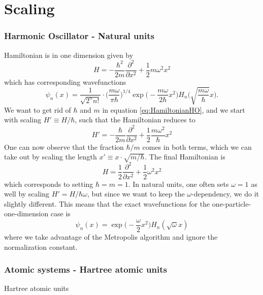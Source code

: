\chapter{Scaling}

\subsection{Harmonic Oscillator - Natural units}
Hamiltonian is in one dimension given by
\begin{equation}
H=-\frac{\hbar^2}{2m}\frac{\partial^2}{\partial x^2}+\frac{1}{2}m\omega^2x^2
\label{eq:HamiltonianHO}
\end{equation}
which has corresponding wavefunctions
\begin{equation}
\psi_n(x)=\frac{1}{\sqrt{2^nn!}}\cdot\bigg(\frac{m\omega}{\pi\hbar}\bigg)^{1/4}\exp\Big(-\frac{m\omega}{2\hbar}x^2\Big)H_n\Big(\sqrt{\frac{m\omega}{\hbar}}x\Big).
\end{equation}
We want to get rid of $\hbar$ and $m$ in equation \eqref{eq:HamiltonianHO}, and we start with scaling $H'\equiv H/\hbar$, such that the Hamiltonian reduces to
\begin{equation}
H'=-\frac{\hbar}{2m}\frac{\partial^2}{\partial x^2}+\frac{1}{2}\frac{m\omega^2}{\hbar}x^2
\end{equation}
One can now observe that the fraction $\hbar/m$ comes in both terms, which we can take out by scaling the length $x'\equiv x\cdot\sqrt{m/\hbar}$. The final Hamiltonian is
\begin{equation}
H=\frac{1}{2}\frac{\partial^2}{\partial x^2}+\frac{1}{2}\omega^2x^2
\end{equation}
which corresponds to setting $\hbar=m=1$. In natural units, one often sets $\omega=1$ as well by scaling $H'=H/\hbar\omega$, but since we want to keep the $\omega$-dependency, we do it slightly different. This means that the exact wavefunctions for the one-particle-one-dimension case is
\begin{equation}
\psi_n(x)=\exp\Big(-\frac{\omega}{2}x^2\Big)H_n(\sqrt{\omega}x)
\end{equation}
where we take advantage of the Metropolis algorithm and ignore the normalization constant. 

\subsection{Atomic systems - Hartree atomic units}
Hartree atomic units



